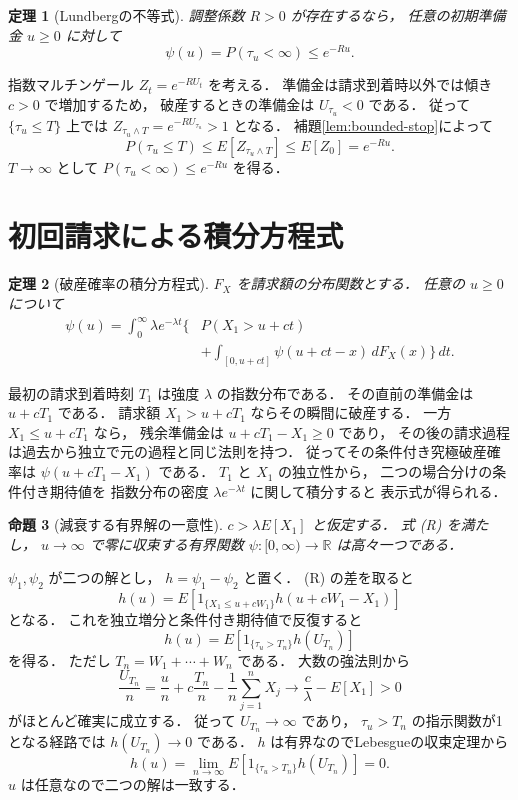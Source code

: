 \documentclass[a5paper,10pt,onecolumn]{jsarticle}
\makeatletter
\theoremstyle{mathnotetheorem}
\newtheorem{theorem}{定理}[section]
\newtheorem{proposition}[theorem]{命題}
\renewcommand{\proofname}{証明}
\renewenvironment{proof}[1][\proofname]{%
  \par\pushQED{\qed}\normalfont\topsep4\p@\@plus2\p@\relax
  \trivlist\item[\hskip\labelsep\bfseries #1]\ignorespaces
}{\popQED\endtrivlist\@endpefalse}
\makeatother
\begin{document}
\begin{theorem}[Lundbergの不等式]\label{thm:lundberg}
調整係数 $R>0$ が存在するなら，
任意の初期準備金 $u\ge0$ に対して
\[
 \psi(u)=P(\tau_u<\infty)\le e^{-Ru}.
\]
\end{theorem}
\begin{proof}
指数マルチンゲール $Z_t=e^{-RU_t}$ を考える．
準備金は請求到着時以外では傾き $c>0$ で増加するため，
破産するときの準備金は $U_{\tau_u}<0$ である．
従って $\{\tau_u\le T\}$ 上では
$Z_{\tau_u\wedge T}=e^{-RU_{\tau_u}}>1$ となる．
補題\ref{lem:bounded-stop}によって
\[
 P(\tau_u\le T)
 \le E[Z_{\tau_u\wedge T}]
 \le E[Z_0]=e^{-Ru}.
\]
$T\to\infty$ として
$P(\tau_u<\infty)\le e^{-Ru}$ を得る．
\end{proof}

\section{初回請求による積分方程式}

\begin{theorem}[破産確率の積分方程式]
\label{thm:ruin-integral}
$F_X$ を請求額の分布関数とする．
任意の $u\ge0$ について
\[
 \begin{aligned}
 \psi(u)=\int_0^\infty\lambda e^{-\lambda t}
 \biggl\{&
 P(X_1>u+ct)\\
 &+\int_{[0,u+ct]}
       \psi(u+ct-x)\,dF_X(x)
 \biggr\}\,dt.
 \end{aligned}
 \tag{R}
\]
\end{theorem}
\begin{proof}
最初の請求到着時刻 $T_1$ は強度 $\lambda$ の指数分布である．
その直前の準備金は $u+cT_1$ である．
請求額 $X_1>u+cT_1$ ならその瞬間に破産する．
一方 $X_1\le u+cT_1$ なら，
残余準備金は $u+cT_1-X_1\ge0$ であり，
その後の請求過程は過去から独立で元の過程と同じ法則を持つ．
従ってその条件付き究極破産確率は
$\psi(u+cT_1-X_1)$ である．
$T_1$ と $X_1$ の独立性から，
二つの場合分けの条件付き期待値を
指数分布の密度 $\lambda e^{-\lambda t}$ に関して積分すると
表示式が得られる．
\end{proof}

\begin{proposition}[減衰する有界解の一意性]
\label{prop:ruin-unique}
$c>\lambda E[X_1]$ と仮定する．
式 (R) を満たし，
$u\to\infty$ で零に収束する有界関数
$\psi:[0,\infty)\to\mathbb R$ は高々一つである．
\end{proposition}
\begin{proof}
$\psi_1,\psi_2$ が二つの解とし，
$h=\psi_1-\psi_2$ と置く．
(R) の差を取ると
\[
 h(u)=E[1_{\{X_1\le u+cW_1\}}
 h(u+cW_1-X_1)]
\]
となる．
これを独立増分と条件付き期待値で反復すると
\[
 h(u)=E[1_{\{\tau_u>T_n\}}h(U_{T_n})]
\]
を得る．
ただし $T_n=W_1+\cdots+W_n$ である．
大数の強法則から
\[
 \frac{U_{T_n}}n
 =\frac un+c\frac{T_n}n
 -\frac1n\sum_{j=1}^nX_j
 \longrightarrow\frac c\lambda-E[X_1]>0
\]
がほとんど確実に成立する．
従って $U_{T_n}\to\infty$ であり，
$\tau_u>T_n$ の指示関数が1となる経路では
$h(U_{T_n})\to0$ である．
$h$ は有界なのでLebesgueの収束定理から
\[
 h(u)=\lim_{n\to\infty}
 E[1_{\{\tau_u>T_n\}}h(U_{T_n})]=0.
\]
$u$ は任意なので二つの解は一致する．
\end{proof}
\end{document}
